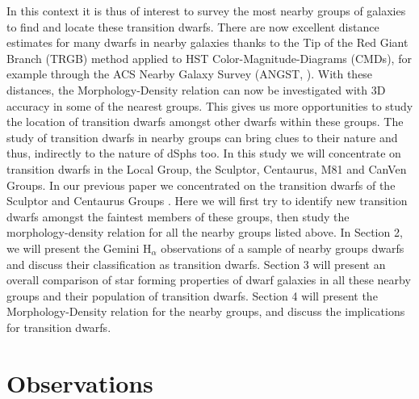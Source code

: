 \documentclass[12pt,preprint]{emulateapj}
\begin{document}
In this context it is thus of interest to survey the most nearby groups of galaxies to find and locate these transition dwarfs. There are now excellent 
distance estimates for many dwarfs in nearby galaxies thanks to the Tip of the Red Giant Branch (TRGB) method applied to HST Color-Magnitude-Diagrams 
(CMDs), for example through the ACS Nearby Galaxy Survey (ANGST, \cite{dal09}). With these distances, the Morphology-Density relation can now be 
investigated with 3D accuracy in some of the nearest groups. This gives us more opportunities to study the location of transition dwarfs amongst other 
dwarfs within these groups. The study of transition dwarfs in nearby groups can bring clues to their nature and thus, indirectly to the nature of dSphs
too. In this study we will concentrate on transition dwarfs in the Local Group, the Sculptor, Centaurus, M81 and CanVen Groups. 
In our previous paper we concentrated on the transition dwarfs of the Sculptor and Centaurus Groups \citep{scm03a, cds09}. 
Here we will first try to identify new transition dwarfs amongst the faintest members of these groups, then study the morphology-density relation for all the nearby groups listed above. In Section 2, we will present the Gemini H$_\alpha$ observations of a sample of nearby groups dwarfs and discuss their classification as transition 
dwarfs. Section 3 will present an overall comparison of star forming properties of dwarf galaxies in all these nearby groups and their population of transition 
dwarfs. Section 4 will present the Morphology-Density relation for the nearby groups, and discuss the implications for transition dwarfs.

\section{Observations}

\end{document}
